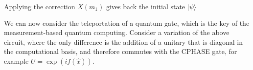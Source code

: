 \documentclass[pra,
superscriptaddress,
 amsmath,amssymb,
 aps,twocolumn]{revtex4-1}
\newcommand{\ket}[1]{|{#1}\rangle}
\begin{document}
Applying the correction $X(m_1)$ gives back the initial state $\ket{\psi}$


We can now consider the teleportation of a quantum gate, which is the key of the measurement-based quantum computing.
Consider a variation of the above circuit, where the only difference is the addition of a unitary that is diagonal 
in the computational basis, and therefore commutes with the CPHASE gate, for example $U=\exp(i f(\hat x))$. 
\end{document}
